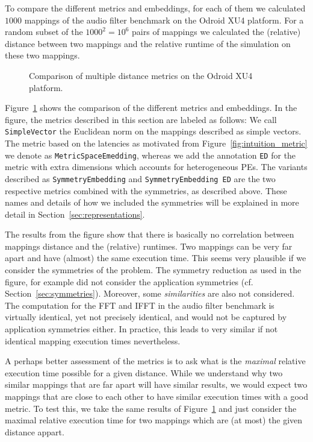 To compare the different metrics and embeddings, for each of them we calculated $1000$ mappings of the audio filter benchmark on the Odroid XU4 platform. 
For a random subset of the $1000^2 = 10^6$ pairs of mappings we calculated the (relative) distance between two mappings and the relative runtime of the simulation on these two mappings.

\begin{figure}[h]
	\centering
	\caption{Comparison of multiple distance metrics on the Odroid XU4 platform.}
	\label{fig:metric_comparison_exynos}
\end{figure}

Figure~\ref{fig:metric_comparison_exynos} shows the comparison of the different metrics and embeddings.
In the figure, the metrics described in this section are labeled as follows: We call \texttt{SimpleVector} the Euclidean norm on the mappings described as simple vectors. 
The metric based on the latencies as motivated from Figure~\ref{fig:intuition_metric} we denote as \texttt{MetricSpaceEmedding}, whereas we add the annotation \texttt{ED} for the metric with extra dimensions which accounts for heterogeneous \acp{PE}.
The variants described as \texttt{SymmetryEmbedding} and \texttt{SymmetryEmbedding ED} are the two respective metrics combined with the symmetries, as described above. 
These names and details of how we included the symmetries will be explained in more detail in Section~\ref{sec:representations}.

The results from the figure show that there is basically no correlation between mappings distance and the (relative) runtimes.
Two mappings can be very far apart and have (almost) the same execution time. 
This seems very plausible if we consider the symmetries of the problem.
The symmetry reduction as used in the figure, for example did not consider the application symmetries (cf. Section~\ref{sec:symmetries}).
Moreover, some \emph{similarities} are also not considered.
The computation for the \ac{FFT} and \ac{IFFT} in the audio filter benchmark is virtually identical, yet not precisely identical, and would not be captured by application symmetries either.
In practice, this leads to very similar if not identical mapping execution times nevertheless.

A perhaps better assessment of the metrics is to ask what is the \emph{maximal} relative execution time possible for a given distance.
While we understand why two similar mappings that are far apart will have similar results, we would expect two mappings that are close to each other to have similar execution times with a good metric.
To test this, we take the same results of Figure~\ref{fig:metric_comparison_exynos} and just consider the maximal relative execution time for two mappings which are (at most) the given distance appart.


